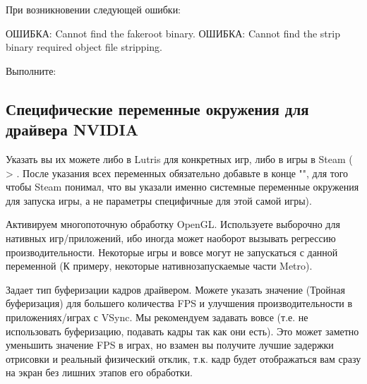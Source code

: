 \documentclass[letterpaper,10pt,russian,openany]{sphinxmanual}
\begin{document}
\sphinxAtStartPar
При возникновении следующей ошибки:

\begin{sphinxVerbatim}[commandchars=\\\{\}]
\PYGZgt{} ОШИБКА: Cannot find the fakeroot binary.
\PYGZgt{} ОШИБКА: Cannot find the strip binary required  object file stripping.
\end{sphinxVerbatim}

\sphinxAtStartPar
Выполните: 

\ignorespaces 

\subsection{Специфические переменные окружения для драйвера NVIDIA}
\label{\detokenize{source/first-steps:nvidia-env-vars}}\label{\detokenize{source/first-steps:index-13}}\label{\detokenize{source/first-steps:id12}}
\sphinxAtStartPar
Указать вы их можете либо в Lutris для конкретных игр, либо в  игры в Steam
( \sphinxhyphen{}> . После указания всех переменных обязательно добавьте в конце "",
для того чтобы Steam понимал, что вы указали именно системные переменные окружения для запуска игры, а не параметры специфичные для этой самой игры).

\sphinxAtStartPar
{}  \sphinxhyphen{}  Активируем многопоточную обработку OpenGL.
Используете выборочно для нативных игр/приложений, ибо иногда может наоборот вызывать регрессию производительности.
Некоторые игры и вовсе могут не запускаться с данной переменной (К примеру, некоторые нативно\sphinxhyphen{}запускаемые части Metro).

\sphinxAtStartPar
{}  \sphinxhyphen{} Задает тип буферизации кадров драйвером.
Можете указать значение  (Тройная буферизация) для большего количества FPS и улучшения производительности в приложениях/играх с VSync.
Мы рекомендуем задавать вовсе  (т.е. не использовать буферизацию, подавать кадры так как они есть).
Это может заметно уменьшить значение FPS в играх, но взамен вы получите лучшие задержки отрисовки и реальный физический отклик,
т.к. кадр будет отображаться вам сразу на экран без лишних этапов его обработки.
\end{document}
